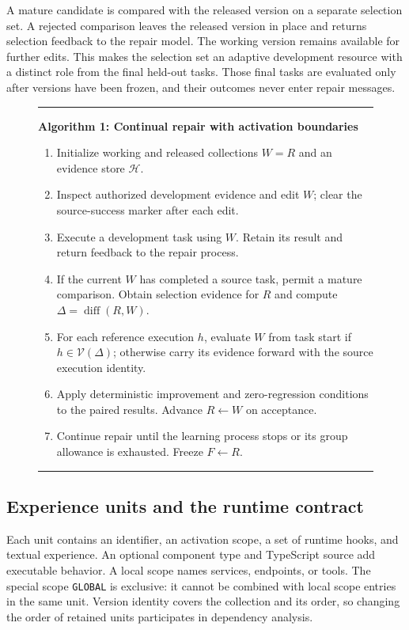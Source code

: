 \documentclass{ecai}
\newcommand{\Global}{\texttt{GLOBAL}}
\begin{document}
A mature candidate is compared with the released version on a separate selection set. A rejected comparison leaves the released version in place and returns selection feedback to the repair model. The working version remains available for further edits. This makes the selection set an adaptive development resource with a distinct role from the final held-out tasks. Those final tasks are evaluated only after versions have been frozen, and their outcomes never enter repair messages.

\begin{figure}[t]
\hrule\smallskip
\small
\noindent\textbf{Algorithm 1: Continual repair with activation boundaries}
\begin{enumerate}
\setlength{\itemsep}{2pt}
\item Initialize working and released collections $W=R$ and an evidence store $\mathcal H$.
\item Inspect authorized development evidence and edit $W$; clear the source-success marker after each edit.
\item Execute a development task using $W$. Retain its result and return feedback to the repair process.
\item If the current $W$ has completed a source task, permit a mature comparison. Obtain selection evidence for $R$ and compute $\Delta=\operatorname{diff}(R,W)$.
\item For each reference execution $h$, evaluate $W$ from task start if $h\in\mathcal V(\Delta)$; otherwise carry its evidence forward with the source execution identity.
\item Apply deterministic improvement and zero-regression conditions to the paired results. Advance $R\leftarrow W$ on acceptance.
\item Continue repair until the learning process stops or its group allowance is exhausted. Freeze $F\leftarrow R$.
\end{enumerate}
\smallskip\hrule
\end{figure}

\subsection{Experience units and the runtime contract}

Each unit contains an identifier, an activation scope, a set of runtime hooks, and textual experience. An optional component type and TypeScript source add executable behavior. A local scope names services, endpoints, or tools. The special scope \Global{} is exclusive: it cannot be combined with local scope entries in the same unit. Version identity covers the collection and its order, so changing the order of retained units participates in dependency analysis.
\end{document}
